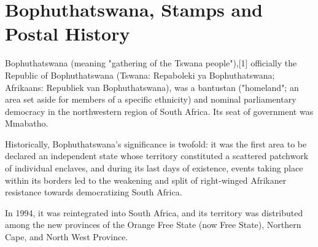 \section{Bophuthatswana, Stamps and Postal History}

Bophuthatswana (meaning "gathering of the Tswana people"),[1] officially the 
Republic of Bophuthatswana (Tswana: Repaboleki ya Bophuthatswana; Afrikaans: 
Republiek van Bophuthatswana), was a bantustan ("homeland"; an area set aside for members of a specific ethnicity) and nominal parliamentary democracy in the 
northwestern 
region of South Africa. Its seat of government was Mmabatho.

Historically, Bophuthatswana's significance is twofold: it was the first area to be declared an independent state whose territory constituted a scattered patchwork of individual enclaves, and during its last days of existence, events taking place 
within its borders led to the weakening and split of right-winged Afrikaner 
resistance towards democratizing South Africa.

In 1994, it was reintegrated into South Africa, and its territory was distributed 
among the new provinces of the Orange Free State (now Free State), Northern 
Cape, and North West Province.



                                      